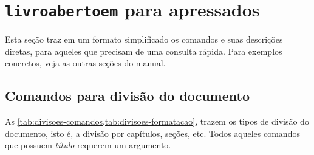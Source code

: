 \section{\texttt{livroabertoem} para apressados}\label{sec:apressados}

Esta seção traz em um formato simplificado os comandos e suas
descrições diretas, para aqueles que precisam de uma consulta rápida.
Para exemplos concretos, veja as outras seções do manual.

\subsection{Comandos para divisão do documento}\label{sec:comandos-divisao}

As \cref{tab:divisoes-comandos,tab:divisoes-formatacao}, trazem os
tipos de divisão do documento, isto é, a divisão por capítulos, seções,
etc. Todos aqueles comandos que possuem \emph{título} requerem um
argumento.

